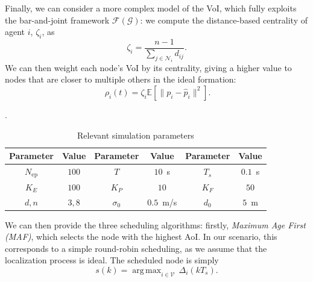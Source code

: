 \documentclass{ifac/ifacconf}
\DeclareMathOperator*{\argmax}{arg\,max}    %
\begin{document}
Finally, we can consider a more complex model of the VoI, which fully exploits the bar-and-joint framework $\mathcal{F}(\mathcal{G})$: we compute the distance-based centrality of agent $i$, $\zeta_i$, as
\begin{equation}
    \zeta_i=\frac{n-1}{\sum_{j\in\mathcal{N}_i}d_{ij}}.
\end{equation}
We can then weight each node's VoI by its centrality, giving a higher value to nodes that are closer to multiple others in the ideal formation:
\begin{equation}~\label{eq:voi_central}
    \rho_i(t)=\zeta_i \mathbb{E}\left[\|p_i-\hat{p}_i\|^2\right].
\end{equation}


\begin{table}[b]
\captionsetup{font=small, width=\textwidth}
\caption{Relevant simulation parameters}.
\centering
\scriptsize{\begin{tabular}{cc|cc|cc}
\toprule
Parameter & Value & Parameter & Value & Parameter & Value\\ \midrule
$N_{\text{ep}}$ & $100$ & $T$ & $10$~s & $T_s$ & $0.1$~s\\
$K_E$ & $100$ &$K_P$ & $10$ & $K_F$& $50$\\
$d,n$ & $3,8$ &$\sigma_0$ & $0.5$~m/s & $d_0$& $5$~m\\
\bottomrule
\end{tabular}\label{tab:param}}
\end{table}


We can then provide the three scheduling algorithms: firstly, \emph{Maximum Age First (MAF)}, which selects the node with the highest AoI. In our scenario, this corresponds to a simple round-robin scheduling, as we assume that the localization process is ideal. The scheduled node is simply
    \begin{equation}
        s(k)=\argmax_{i\in\mathcal{V}}\,\Delta_i(kT_s).
    \end{equation}
\end{document}
